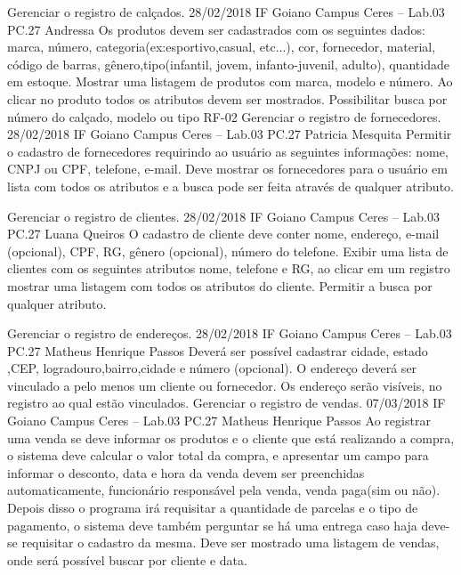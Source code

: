 \begin{center}
	   {Gerenciar o registro de calçados.}
	   {28/02/2018}
	   {IF Goiano Campus Ceres – Lab.03 PC.27}
	   {Andressa}
	   {Os produtos devem ser cadastrados com os seguintes dados: marca, número, categoria(ex:esportivo,casual, etc...), cor, fornecedor, material, código de barras, gênero,tipo(infantil, jovem, infanto-juvenil, adulto), quantidade em estoque. Mostrar uma listagem de produtos com marca, modelo e número. Ao clicar no produto todos os atributos devem ser mostrados. Possibilitar busca por número do calçado, modelo ou tipo}
	 \addrequisito
	   	{RF-02}
	    {Gerenciar o registro de fornecedores.}
	    {28/02/2018}
	    {IF Goiano Campus Ceres – Lab.03 PC.27}
	    {Patricia Mesquita}
	    {Permitir o cadastro de fornecedores requirindo ao usuário as seguintes informações: nome, CNPJ ou CPF, telefone, e-mail. Deve mostrar os fornecedores para o usuário em lista com todos os atributos e a busca pode ser feita através de qualquer atributo.}
		
	    {Gerenciar o registro de clientes.}
	    {28/02/2018}
	    {IF Goiano Campus Ceres – Lab.03 PC.27}
	   	{Luana Queiros}
	    {O cadastro de cliente deve conter nome, endereço, e-mail (opcional), CPF, RG, gênero (opcional), número do telefone. Exibir uma lista de clientes com os seguintes atributos nome, telefone e RG, ao clicar em um registro mostrar uma listagem com todos os atributos do cliente. Permitir a busca por qualquer atributo.}
	    
		{Gerenciar o registro de endereços.}
		{28/02/2018}
		{IF Goiano Campus Ceres – Lab.03 PC.27}
		{Matheus Henrique Passos}    
		{Deverá ser possível cadastrar cidade, estado ,CEP, logradouro,bairro,cidade e número (opcional). O endereço deverá ser vinculado a pelo menos um cliente ou fornecedor. Os endereço serão visíveis, no registro ao qual estão vinculados.}  
		{Gerenciar o registro de vendas.}
		{07/03/2018}
		{IF Goiano Campus Ceres – Lab.03 PC.27}
		{Matheus Henrique Passos}
		{Ao registrar uma venda se deve informar os produtos e o cliente que está realizando a compra, o sistema deve calcular o valor total da compra, e apresentar um campo para informar o desconto, data e hora da venda devem ser preenchidas automaticamente, funcionário responsável pela venda, venda paga(sim ou não). Depois disso o programa irá requisitar a quantidade de parcelas e o tipo de pagamento, o sistema deve também perguntar se há uma entrega caso haja deve-se requisitar o cadastro da mesma. Deve ser mostrado uma listagem de vendas, onde será possível buscar por cliente e data.}
		

\end{center}
